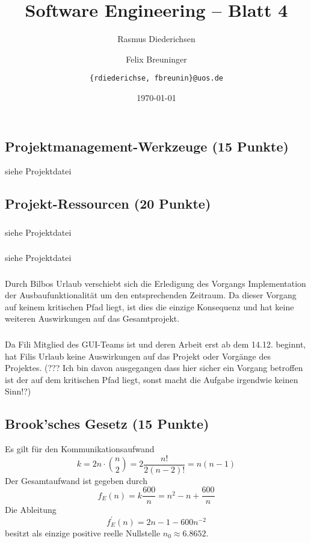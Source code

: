 \documentclass{scrartcl}
\title{\rmfamily Software Engineering -- Blatt 4}
\author{Rasmus Diederichsen \and Felix Breuninger\and %
   \texttt{\{rdiederichse, fbreunin\}@uos.de}
}
\date{\today}
\begin{document}
\selectfont
\maketitle

\setcounter{section}{4}
\setcounter{subsection}{0}

\subsection{Projektmanagement-Werkzeuge (15 Punkte)}
siehe Projektdatei

\subsection{Projekt-Ressourcen (20 Punkte)}
\subsubsection{}
siehe Projektdatei
\subsubsection{}
siehe Projektdatei

\subsubsection{}
Durch Bilbos Urlaub verschiebt sich die Erledigung des Vorgangs Implementation der Ausbaufunktionalität um den entsprechenden Zeitraum. Da dieser Vorgang auf keinem kritischen Pfad liegt, ist dies die einzige Konsequenz und hat keine weiteren Auswirkungen auf das Gesamtprojekt.

\subsubsection{}
Da Fili Mitglied des GUI-Teams ist und deren Arbeit erst ab dem 14.12. beginnt, hat Filis Urlaub keine Auswirkungen auf das Projekt oder Vorgänge des Projektes. (??? Ich bin davon ausgegangen dass hier sicher ein Vorgang betroffen ist der auf dem kritischen Pfad liegt, sonst macht die Aufgabe irgendwie keinen Sinn!?)

\subsection{Brook'sches Gesetz (15 Punkte)}

Es gilt für den Kommunikationsaufwand
\begin{equation*}
   k = 2n \cdot {n \choose 2} = 2 \frac{n!}{2(n-2)!} = n(n-1)
\end{equation*}
Der Gesamtaufwand ist gegeben durch
\begin{equation*}
   f_E(n) = k \frac{600}{n} = n^2 - n + \frac{600}{n}
\end{equation*}
Die Ableitung
\begin{equation*}
   f_E^\prime(n) = 2n -1 - 600n^{-2}
\end{equation*}
besitzt als einzige positive reelle Nullstelle $n_0 \approx 6.8652$.
\end{document}
